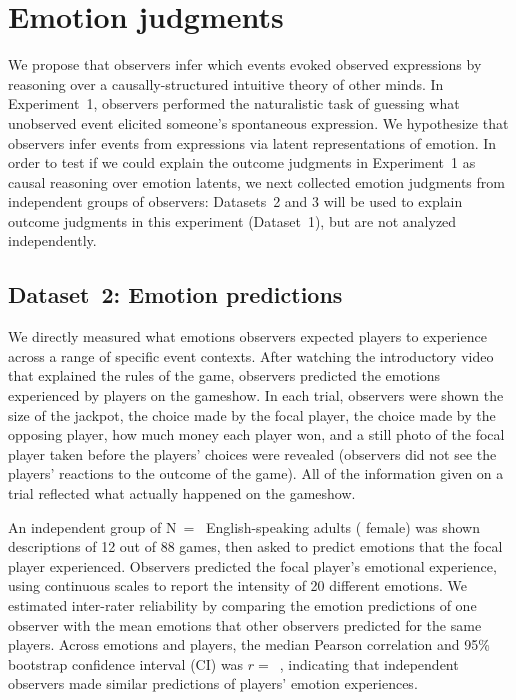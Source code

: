 \documentclass[10pt,letterpaper]{article}
\begin{document}
\section{Emotion judgments}

We propose that observers infer which events evoked observed expressions by reasoning over a causally-structured intuitive theory of other minds. 
In Experiment~1, observers performed the naturalistic task of guessing what unobserved event elicited someone's spontaneous expression. 
We hypothesize that observers infer events from expressions via latent representations of emotion.
In order to test if we could explain the outcome judgments in Experiment~1 as causal reasoning over emotion latents, we next collected emotion judgments from independent groups of observers: Datasets~2 and 3 will be used to explain outcome judgments in this experiment (Dataset~1), but are not analyzed independently.

\subsection{Dataset~2: Emotion predictions}

We directly measured what emotions observers expected players to experience across a range of specific event contexts. After watching the introductory video that explained the rules of the game, observers predicted the emotions experienced by players on the gameshow. In each trial, observers were shown the size of the jackpot, the choice made by the focal player, the choice made by the opposing player, how much money each player won, and a still photo of the focal player taken before the players' choices were revealed (observers did not see the players' reactions to the outcome of the game).
All of the information given on a trial 
reflected what actually happened on the gameshow. 

An independent group of N~=~ English-speaking adults ( female) was shown descriptions of 12 out of 88 games, then asked to predict emotions that the focal player experienced.
Observers predicted the focal player's emotional experience, using continuous scales to report the intensity of 20 different emotions. 
We estimated inter-rater reliability by comparing the emotion predictions of one observer with the mean emotions that other observers predicted for the same players. 
Across emotions and players, the median Pearson correlation and 95\% bootstrap confidence interval (CI) was $r=$~, indicating that independent observers made similar predictions of players' emotion experiences.
\end{document}
